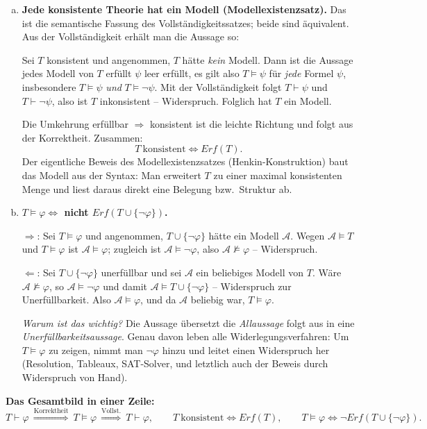 \begin{loesung}
\begin{enumerate}[a)]
  Merksatz: Eine inkonsistente Theorie ist genau diejenige, die \emph{alles} beweist; sie sagt damit über die Welt nichts mehr aus.

  \item \textbf{Jede konsistente Theorie hat ein Modell (Modellexistenzsatz).} Das ist die semantische Fassung des Vollständigkeitssatzes; beide sind äquivalent. Aus der Vollständigkeit erhält man die Aussage so:

  Sei $T$ konsistent und angenommen, $T$ hätte \emph{kein} Modell. Dann ist die Aussage \glqq{}jedes Modell von $T$ erfüllt $\psi$\grqq{} leer erfüllt, es gilt also $T\models\psi$ für \emph{jede} Formel $\psi$, insbesondere $T\models\psi$ \emph{und} $T\models\neg\psi$. Mit der Vollständigkeit folgt $T\vdash\psi$ und $T\vdash\neg\psi$, also ist $T$ inkonsistent -- Widerspruch. Folglich hat $T$ ein Modell.

  Die Umkehrung \glqq{}erfüllbar $\Rightarrow$ konsistent\grqq{} ist die leichte Richtung und folgt aus der Korrektheit. Zusammen:
  \[T\ \text{konsistent}\iff Erf(T).\]
  Der eigentliche Beweis des Modellexistenzsatzes (Henkin-Konstruktion) baut das Modell aus der Syntax: Man erweitert $T$ zu einer maximal konsistenten Menge und liest daraus direkt eine Belegung bzw.\ Struktur ab.

  \item \textbf{$T\models\varphi\iff$ nicht $Erf(T\cup\{\neg\varphi\})$.}

  \glqq{}$\Rightarrow$\grqq{}: Sei $T\models\varphi$ und angenommen, $T\cup\{\neg\varphi\}$ hätte ein Modell $\mathcal{A}$. Wegen $\mathcal{A}\models T$ und $T\models\varphi$ ist $\mathcal{A}\models\varphi$; zugleich ist $\mathcal{A}\models\neg\varphi$, also $\mathcal{A}\not\models\varphi$ -- Widerspruch.

  \glqq{}$\Leftarrow$\grqq{}: Sei $T\cup\{\neg\varphi\}$ unerfüllbar und sei $\mathcal{A}$ ein beliebiges Modell von $T$. Wäre $\mathcal{A}\not\models\varphi$, so $\mathcal{A}\models\neg\varphi$ und damit $\mathcal{A}\models T\cup\{\neg\varphi\}$ -- Widerspruch zur Unerfüllbarkeit. Also $\mathcal{A}\models\varphi$, und da $\mathcal{A}$ beliebig war, $T\models\varphi$.

  \emph{Warum ist das wichtig?} Die Aussage übersetzt die \emph{Allaussage} \glqq{}folgt aus\grqq{} in eine \emph{Unerfüllbarkeitsaussage}. Genau davon leben alle Widerlegungsverfahren: Um $T\models\varphi$ zu zeigen, nimmt man $\neg\varphi$ hinzu und leitet einen Widerspruch her (Resolution, Tableaux, SAT-Solver, und letztlich auch der Beweis \glqq{}durch Widerspruch\grqq{} von Hand).
\end{enumerate}

\medskip
\textbf{Das Gesamtbild in einer Zeile:}
\[T\vdash\varphi\ \overset{\text{Korrektheit}}{\Longrightarrow}\ T\models\varphi\ \overset{\text{Vollst.}}{\Longrightarrow}\ T\vdash\varphi,
\qquad
T\ \text{konsistent}\iff Erf(T),
\qquad
T\models\varphi\iff \neg Erf(T\cup\{\neg\varphi\}).\]
\end{loesung}

